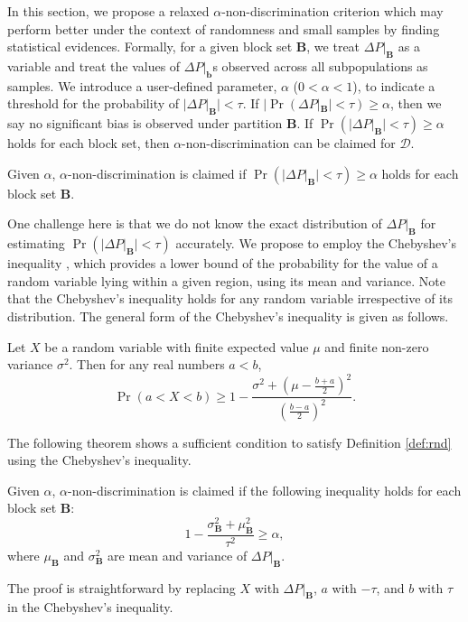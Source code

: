 \documentclass[twoside,leqno,twocolumn]{article}
\begin{document}
In this section, we propose a relaxed $\alpha$-non-discrimination criterion which may perform better under the context of randomness and small samples by finding statistical evidences. Formally, for a given block set $\mathbf{B}$, we treat $\Delta P|_{\mathbf{B}}$ as a variable and treat the values of $\Delta P|_{\mathbf{b}}$s observed across all subpopulations as samples. We introduce a user-defined parameter, $\alpha$ ($0 < \alpha < 1$), to indicate a threshold for the probability of $|\Delta P|_{\mathbf{B}}| < \tau$. If $|\Pr(\Delta P|_{\mathbf{B}}| < \tau)\geq \alpha$, then we say no significant bias is observed under partition $\mathbf{B}$. If $\Pr(|\Delta P|_{\mathbf{B}}| < \tau)\geq \alpha$ holds for each block set, then $\alpha$-non-discrimination can be claimed for $\mathcal{D}$.

\begin{Definition}\label{def:rnd}
Given $\alpha$, $\alpha$-non-discrimination is claimed if $\Pr(|\Delta P|_{\mathbf{B}}| < \tau)\geq \alpha$ holds for each block set $\mathbf{B}$.
\end{Definition}
One challenge here is that we do not know the exact distribution of $\Delta P|_{\mathbf{B}}$ for estimating $\Pr(|\Delta P|_{\mathbf{B}}| < \tau)$ accurately. We propose to employ the Chebyshev's inequality \cite{anastassiou2009probabilistic}, which provides a lower bound of the probability for the value of a random variable lying within a given region, using its mean and variance. Note that the Chebyshev's inequality holds for any random variable irrespective of its distribution. The general form of the Chebyshev's inequality is given as follows.
\begin{theorem}
Let $X$ be a random variable with finite expected value $\mu$ and finite non-zero variance $\sigma^{2}$. Then for any real numbers $a < b$,
\begin{equation*}
\Pr(a<X<b) \geq 1-\frac{\sigma^{2}+(\mu-\frac{b+a}{2})^{2}}{(\frac{b-a}{2})^{2}}.
\end{equation*}
\end{theorem}

The following theorem shows a sufficient condition to satisfy Definition \ref{def:rnd} using the Chebyshev's inequality.

\begin{theorem}\label{thm:rnd}
Given $\alpha$, $\alpha$-non-discrimination is claimed if the following inequality holds for each block set $\mathbf{B}$:
\begin{equation*}
1-\frac{\sigma_{\mathbf{B}}^{2}+\mu_{\mathbf{B}}^{2}}{\tau^{2}} \geq \alpha,
\end{equation*}
where $\mu_{\mathbf{B}}$ and $\sigma_{\mathbf{B}}^{2}$ are mean and variance of $\Delta P|_{\mathbf{B}}$.
\end{theorem}
The proof is straightforward by replacing $X$ with $\Delta P|_{\mathbf{B}}$, $a$ with $-\tau$, and $b$ with $\tau$ in the Chebyshev's inequality.
\end{document}
